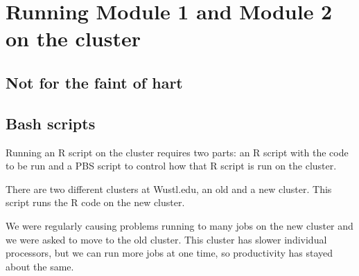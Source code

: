 \documentclass[]{book}
\newenvironment{Shaded}{\begin{snugshade}}{\end{snugshade}}
\newcommand{\CommentTok}[1]{\textcolor[rgb]{0.56,0.35,0.01}{\textit{{#1}}}}
\newcommand{\VariableTok}[1]{\textcolor[rgb]{0.00,0.00,0.00}{{#1}}}
\newcommand{\BuiltInTok}[1]{{#1}}
\newcommand{\ExtensionTok}[1]{{#1}}
\newcommand{\NormalTok}[1]{{#1}}
\theoremstyle{definition}
\theoremstyle{definition}
\theoremstyle{definition}
\theoremstyle{remark}
\begin{document}
\chapter{Running Module 1 and Module 2 on the
cluster}\label{running-module-1-and-module-2-on-the-cluster}

\section{Not for the faint of hart}\label{not-for-the-faint-of-hart}

\section{Bash scripts}\label{bash-scripts}

Running an R script on the cluster requires two parts: an R script with
the code to be run and a PBS script to control how that R script is run
on the cluster.

There are two different clusters at Wustl.edu, an old and a new cluster.
This script runs the R code on the new cluster.

\begin{Shaded}
\end{Shaded}

We were regularly causing problems running to many jobs on the new
cluster and we were asked to move to the old cluster. This cluster has
slower individual processors, but we can run more jobs at one time, so
productivity has stayed about the same.
\end{document}
